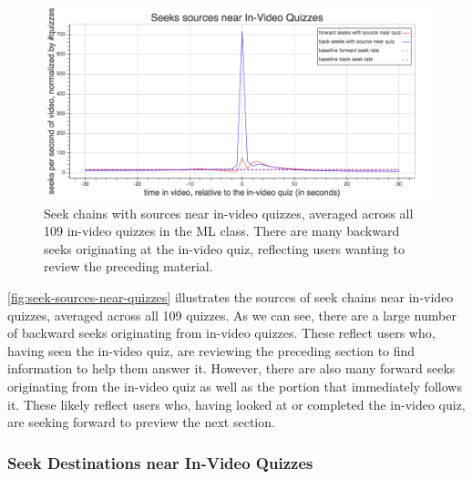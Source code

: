 \documentclass{sigchi}
\begin{document}
\begin{figure}
\includegraphics[width=1.0\columnwidth]{seek-sources-near-quizzes}
\caption{Seek chains with sources near in-video quizzes, averaged across all 109 in-video quizzes in the ML class. There are many backward seeks originating at the in-video quiz, reflecting users wanting to review the preceding material.}
\label{fig:seek-sources-near-quizzes}
\end{figure}

\autoref{fig:seek-sources-near-quizzes} illustrates the sources of seek chains near in-video quizzes, averaged across all 109 quizzes. As we can see, there are a large number of backward seeks originating from in-video quizzes. These reflect users who, having seen the in-video quiz, are reviewing the preceding section to find information to help them answer it. However, there are also many forward seeks originating from the in-video quiz as well as the portion that immediately follows it. These likely reflect users who, having looked at or completed the in-video quiz, are seeking forward to preview the next section.

\subsubsection{Seek Destinations near In-Video Quizzes}
\end{document}
